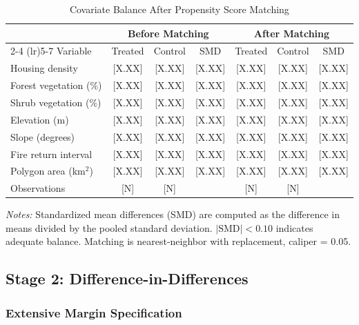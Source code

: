 \documentclass[12pt, letterpaper]{article}
\begin{document}
\begin{table}[H]
\centering
\small
\begin{threeparttable}
\caption{Covariate Balance After Propensity Score Matching}
\label{tab:balance}
\begin{tabular}{lcccccc}
\toprule
& \multicolumn{3}{c}{Before Matching} & \multicolumn{3}{c}{After Matching} \\
\cmidrule(lr){2-4} \cmidrule(lr){5-7}
Variable & Treated & Control & SMD & Treated & Control & SMD \\
\midrule
Housing density & [X.XX] & [X.XX] & [X.XX] & [X.XX] & [X.XX] & [X.XX] \\
Forest vegetation (\%) & [X.XX] & [X.XX] & [X.XX] & [X.XX] & [X.XX] & [X.XX] \\
Shrub vegetation (\%) & [X.XX] & [X.XX] & [X.XX] & [X.XX] & [X.XX] & [X.XX] \\
Elevation (m) & [X.XX] & [X.XX] & [X.XX] & [X.XX] & [X.XX] & [X.XX] \\
Slope (degrees) & [X.XX] & [X.XX] & [X.XX] & [X.XX] & [X.XX] & [X.XX] \\
Fire return interval & [X.XX] & [X.XX] & [X.XX] & [X.XX] & [X.XX] & [X.XX] \\
Polygon area (km$^2$) & [X.XX] & [X.XX] & [X.XX] & [X.XX] & [X.XX] & [X.XX] \\
\midrule
Observations & [N] & [N] & & [N] & [N] & \\
\bottomrule
\end{tabular}
\begin{tablenotes}
\small
\item \textit{Notes:} Standardized mean differences (SMD) are computed as the difference in means divided by the pooled standard deviation. $|\text{SMD}| < 0.10$ indicates adequate balance. Matching is nearest-neighbor with replacement, caliper = 0.05.
\end{tablenotes}
\end{threeparttable}
\end{table}

\subsection{Stage 2: Difference-in-Differences}

\subsubsection{Extensive Margin Specification}
\end{document}
